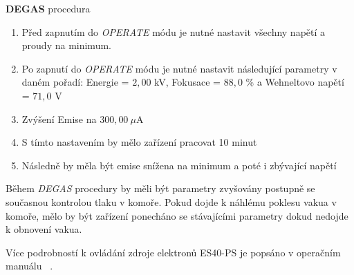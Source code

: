 \textbf{DEGAS} procedura
\begin{enumerate}
\item Před zapnutím do \textit{OPERATE} módu je nutné nastavit všechny napětí a proudy na minimum. 
\item Po zapnutí do \textit{OPERATE} módu je nutné nastavit následující parametry v daném pořadí: Energie = $2{,}00$ kV, Fokusace = $88{,}0$ \% a Wehneltovo napětí = $71{,}0$ V
\item Zvýšení Emise na $300{,}00 \ \mu$A 
\item S tímto nastavením by mělo zařízení pracovat 10 minut
\item Následně by měla být emise snížena na minimum a poté i zbývající napětí
\end{enumerate}
Během \textit{DEGAS} procedury by měli být parametry zvyšovány postupně se současnou kontrolou tlaku v komoře. Pokud dojde k náhlému poklesu vakua v komoře, mělo by být zařízení ponecháno se stávajícími parametry dokud nedojde k obnovení vakua.

Více podrobností k ovládání zdroje elektronů ES40-PS je popsáno v operačním manuálu ~\cite{Manual}.